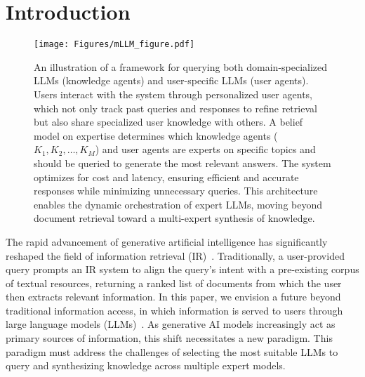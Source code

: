 \section{Introduction}

\begin{figure*}[t]
        \centering
        \texttt{[image: Figures/mLLM\_figure.pdf]}
        \caption{An illustration of a framework for querying both domain-specialized LLMs (knowledge agents) and user-specific LLMs (user agents). Users interact with the system through personalized user agents, which not only track past queries and responses to refine retrieval but also share specialized user knowledge with others. A belief model on expertise determines which knowledge agents ($K_1, K_2, \dots, K_M$) and user agents are experts on specific topics and should be queried to generate the most relevant answers. The system optimizes for cost and latency, ensuring efficient and accurate responses while minimizing unnecessary queries. This architecture enables the dynamic orchestration of expert LLMs, moving beyond document retrieval toward a multi-expert synthesis of knowledge.}
    \label{fig:metaLLM}
\end{figure*}

The rapid advancement of generative artificial intelligence has significantly reshaped the field of information retrieval (IR)~\cite{zhu2023large,allan-2024-future,white2025information}. Traditionally, a user-provided query prompts an IR system to align the query's intent with a pre-existing corpus of textual resources, returning a ranked list of documents from which the user then extracts relevant information. In this paper, we envision a future beyond traditional information access, in which information is served to users through large language models (LLMs)~\cite{openai2022chatgpt, wei2022emergentabilitieslargelanguage}. As generative AI models increasingly act as primary sources of information, this shift necessitates a new paradigm. This paradigm must address the challenges of selecting the most suitable LLMs to query and synthesizing knowledge across multiple expert models.

